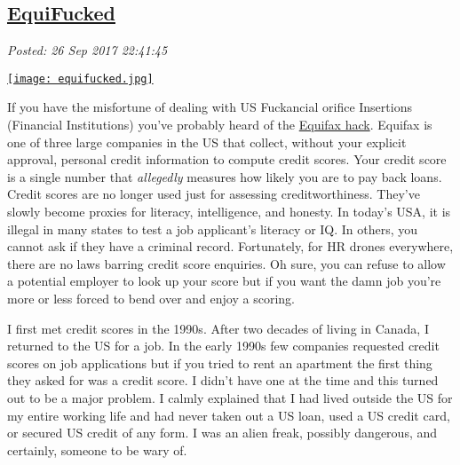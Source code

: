%

\subsection*{\href{http://analyzethedatanotthedrivel.org/2017/09/26/equifucked/}{EquiFucked}}


\noindent\emph{Posted: 26 Sep 2017 22:41:45}
\vspace{6pt}



\captionsetup[floatingfigure]{labelformat=empty}
\begin{floatingfigure}[r]{0.29\textwidth}
\centering
\href{https://bakerjd99.files.wordpress.com/2017/09/equifucked.jpg}{\texttt{[image: equifucked.jpg]}}
\label{fig:5477x0}
\end{floatingfigure}If
you have the misfortune of dealing with US Fuckancial orifice Insertions
(Financial Institutions) you've probably heard of the
\href{http://www.npr.org/2017/09/14/550949718/after-equifax-data-breach-consumers-are-largely-on-their-own}{Equifax
hack}. Equifax is one of three large companies in the US that collect,
without your explicit approval, personal credit information to compute
credit scores. Your credit score is a single number that
\emph{allegedly} measures how likely you are to pay back loans. Credit
scores are no longer used just for assessing creditworthiness. They've
slowly become proxies for literacy, intelligence, and honesty. In
today's USA, it is illegal in many states to test a job applicant's
literacy or IQ. In others, you cannot ask if they have a criminal
record. Fortunately, for HR drones everywhere, there are no laws barring
credit score enquiries. Oh sure, you can refuse to allow a potential
employer to look up your score but if you want the damn job you're more
or less forced to bend over and enjoy a scoring.

I first met credit scores in the 1990s. After two decades of living in
Canada, I returned to the US for a job. In the early 1990s few companies
requested credit scores on job applications but if you tried to rent an
apartment the first thing they asked for was a credit score. I didn't
have one at the time and this turned out to be a major problem. I calmly
explained that I had lived outside the US for my entire working life and
had never taken out a US loan, used a US credit card, or secured US
credit of any form. I was an alien freak, possibly dangerous, and
certainly, someone to be wary of.


